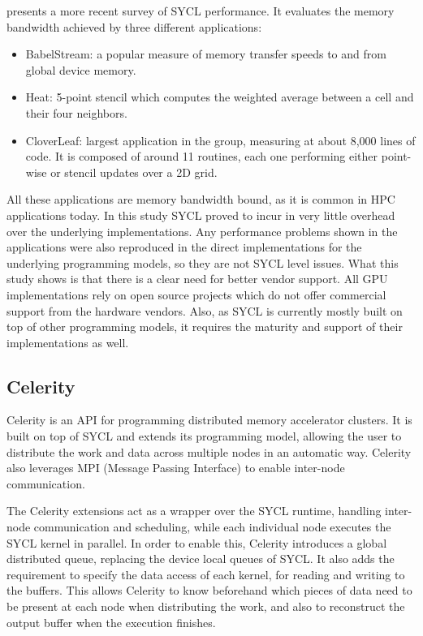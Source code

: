 \cite{sycl_hpc_applications} presents a more recent survey of SYCL performance. It evaluates the memory bandwidth achieved by three different applications:
\begin{itemize}
    \item BabelStream: a popular measure of memory transfer speeds to and from global device memory.
    \item Heat: 5-point stencil which computes the weighted average between a cell and their four neighbors.
    \item CloverLeaf: largest application in the group, measuring at about 8,000 lines of code. It is composed of around 11 routines, each one performing either point-wise or stencil updates over a 2D grid.
\end{itemize}
All these applications are memory bandwidth bound, as it is common in HPC applications today.
In this study SYCL proved to incur in very little overhead over the underlying implementations. Any performance problems shown in the applications were also reproduced in the direct implementations for the underlying programming models, so they are not SYCL level issues. What this study shows is that there is a clear need for better vendor support. All GPU implementations rely on open source projects which do not offer commercial support from the hardware vendors. Also, as SYCL is currently mostly built on top of other programming models, it requires the maturity and support of their implementations as well.

\subsection{Celerity}
Celerity \cite{celerity} is an API for programming distributed memory accelerator clusters. It is built on top of SYCL and extends its programming model, allowing the user to distribute the work and data across multiple nodes in an automatic way. Celerity also leverages MPI (Message Passing Interface) \cite{mpi} to enable inter-node communication.

The Celerity extensions act as a wrapper over the SYCL runtime, handling inter-node communication and scheduling, while each individual node executes the SYCL kernel in parallel. In order to enable this, Celerity introduces a global distributed queue, replacing the device local queues of SYCL. It also adds the requirement to specify the data access of each kernel, for reading and writing to the buffers. This allows Celerity to know beforehand which pieces of data need to be present at each node when distributing the work, and also to reconstruct the output buffer when the execution finishes.

